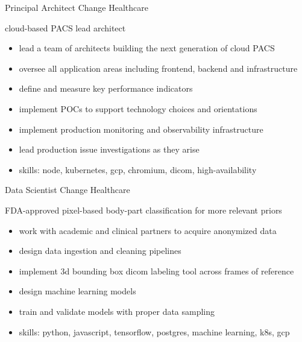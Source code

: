 \documentclass[print]{friggeri-cv}
\begin{document}
\begin{entrylist}
  {Principal Architect} {Change Healthcare}
  {cloud-based PACS lead architect
  \begin{itemize}
    \item lead a team of architects building the next generation of cloud PACS
    \item oversee all application areas including frontend, backend and infrastructure
    \item define and measure key performance indicators
    \item implement POCs to support technology choices and orientations
    \item implement production monitoring and observability infrastructure
    \item lead production issue investigations as they arise
    \item skills: node, kubernetes, gcp, chromium, dicom, high-availability
  \end{itemize}}

  {Data Scientist} {Change Healthcare}
  {FDA-approved pixel-based body-part classification for more relevant priors 
  \begin{itemize}
    \item work with academic and clinical partners to acquire anonymized data
    \item design data ingestion and cleaning pipelines
    \item implement 3d bounding box dicom labeling tool across frames of reference
    \item design machine learning models
    \item train and validate models with proper data sampling
    \item skills: python, javascript, tensorflow, postgres, machine learning, k8s, gcp
  \end{itemize}}

\end{entrylist}

\clearpage
\end{document}
